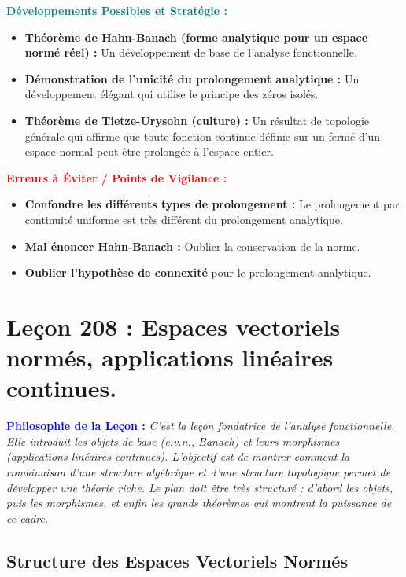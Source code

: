 \documentclass[12pt, a4paper, parskip=full]{report}
\theoremstyle{agregstyle}
\newenvironment{philosophie}
  {\par\medskip\noindent\begin{oframed}\noindent\textbf{\textcolor{blue}{Philosophie de la Leçon :}}\itshape}
  {\end{oframed}\par\medskip}
\newenvironment{developpements}
  {\par\medskip\noindent\begin{oframed}\noindent\textbf{\textcolor{teal}{Développements Possibles et Stratégie :}}}
  {\end{oframed}\par\medskip}
\newenvironment{erreurs}
  {\par\medskip\noindent\begin{oframed}\noindent\textbf{\textcolor{red}{Erreurs à Éviter / Points de Vigilance :}}}
  {\end{oframed}\par\medskip}
\begin{document}
\begin{developpements}
    \begin{itemize}
        \item \textbf{Théorème de Hahn-Banach (forme analytique pour un espace normé réel) :} Un développement de base de l'analyse fonctionnelle.
        \item \textbf{Démonstration de l'unicité du prolongement analytique :} Un développement élégant qui utilise le principe des zéros isolés.
        \item \textbf{Théorème de Tietze-Urysohn (culture) :} Un résultat de topologie générale qui affirme que toute fonction continue définie sur un fermé d'un espace normal peut être prolongée à l'espace entier.
    \end{itemize}
\end{developpements}

\begin{erreurs}
    \begin{itemize}
        \item \textbf{Confondre les différents types de prolongement :} Le prolongement par continuité uniforme est très différent du prolongement analytique.
        \item \textbf{Mal énoncer Hahn-Banach :} Oublier la conservation de la norme.
        \item \textbf{Oublier l'hypothèse de connexité} pour le prolongement analytique.
    \end{itemize}
\end{erreurs}

\newpage
\chapter{Leçon 208 : Espaces vectoriels normés, applications linéaires continues.}

\begin{philosophie}
    C'est la leçon fondatrice de l'analyse fonctionnelle. Elle introduit les objets de base (e.v.n., Banach) et leurs morphismes (applications linéaires continues). L'objectif est de montrer comment la combinaison d'une structure algébrique et d'une structure topologique permet de développer une théorie riche. Le plan doit être très structuré : d'abord les objets, puis les morphismes, et enfin les grands théorèmes qui montrent la puissance de ce cadre.
\end{philosophie}

\section{Structure des Espaces Vectoriels Normés}
\end{document}

